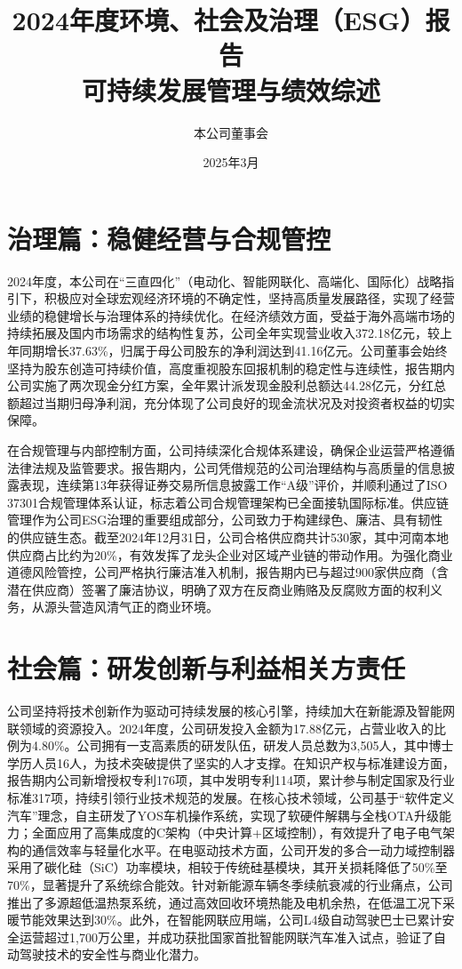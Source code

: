 \documentclass[a4paper,12pt]{article}
\title{\textbf{\huge 2024年度环境、社会及治理（ESG）报告}\\ \vspace{0.5em} \large 可持续发展管理与绩效综述}
\author{本公司董事会}
\date{2025年3月}
\begin{document}
\maketitle

\section{治理篇：稳健经营与合规管控}

2024年度，本公司在“三直四化”（电动化、智能网联化、高端化、国际化）战略指引下，积极应对全球宏观经济环境的不确定性，坚持高质量发展路径，实现了经营业绩的稳健增长与治理体系的持续优化。在经济绩效方面，受益于海外高端市场的持续拓展及国内市场需求的结构性复苏，公司全年实现营业收入372.18亿元，较上年同期增长37.63\%，归属于母公司股东的净利润达到41.16亿元。公司董事会始终坚持为股东创造可持续价值，高度重视股东回报机制的稳定性与连续性，报告期内公司实施了两次现金分红方案，全年累计派发现金股利总额达44.28亿元，分红总额超过当期归母净利润，充分体现了公司良好的现金流状况及对投资者权益的切实保障。

在合规管理与内部控制方面，公司持续深化合规体系建设，确保企业运营严格遵循法律法规及监管要求。报告期内，公司凭借规范的公司治理结构与高质量的信息披露表现，连续第13年获得证券交易所信息披露工作“A级”评价，并顺利通过了ISO 37301合规管理体系认证，标志着公司合规管理架构已全面接轨国际标准。供应链管理作为公司ESG治理的重要组成部分，公司致力于构建绿色、廉洁、具有韧性的供应链生态。截至2024年12月31日，公司合格供应商共计530家，其中河南本地供应商占比约为20\%，有效发挥了龙头企业对区域产业链的带动作用。为强化商业道德风险管控，公司严格执行廉洁准入机制，报告期内已与超过900家供应商（含潜在供应商）签署了廉洁协议，明确了双方在反商业贿赂及反腐败方面的权利义务，从源头营造风清气正的商业环境。

\section{社会篇：研发创新与利益相关方责任}

公司坚持将技术创新作为驱动可持续发展的核心引擎，持续加大在新能源及智能网联领域的资源投入。2024年度，公司研发投入金额为17.88亿元，占营业收入的比例为4.80\%。公司拥有一支高素质的研发队伍，研发人员总数为3,505人，其中博士学历人员16人，为技术突破提供了坚实的人才支撑。在知识产权与标准建设方面，报告期内公司新增授权专利176项，其中发明专利114项，累计参与制定国家及行业标准317项，持续引领行业技术规范的发展。在核心技术领域，公司基于“软件定义汽车”理念，自主研发了YOS车机操作系统，实现了软硬件解耦与全栈OTA升级能力；全面应用了高集成度的C架构（中央计算+区域控制），有效提升了电子电气架构的通信效率与轻量化水平。在电驱动技术方面，公司开发的多合一动力域控制器采用了碳化硅（SiC）功率模块，相较于传统硅基模块，其开关损耗降低了50\%至70\%，显著提升了系统综合能效。针对新能源车辆冬季续航衰减的行业痛点，公司推出了多源超低温热泵系统，通过高效回收环境热能及电机余热，在低温工况下采暖节能效果达到30\%。此外，在智能网联应用端，公司L4级自动驾驶巴士已累计安全运营超过1,700万公里，并成功获批国家首批智能网联汽车准入试点，验证了自动驾驶技术的安全性与商业化潜力。
\end{document}
